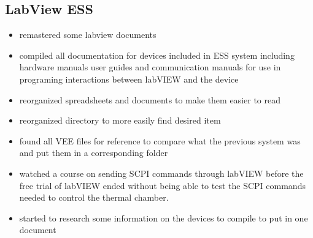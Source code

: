 \documentclass{article}
\begin{document}
\subsection*{LabView ESS}
\begin{itemize}
    \item remastered some labview documents
    \item compiled all documentation for devices included in ESS system including hardware manuals user guides and communication manuals for use in programing interactions between labVIEW and the device
    \item reorganized spreadsheets and documents to make them easier to read
    \item reorganized directory to more easily find desired item
    \item found all VEE files for reference to compare what the previous system was and put them in a corresponding folder
    \item watched a course on sending SCPI commands through labVIEW before the free trial of labVIEW ended without being able to test the SCPI commands needed to control the thermal chamber. 
    \item started to research some information on the devices to compile to put in one document
\end{itemize}
\end{document}
